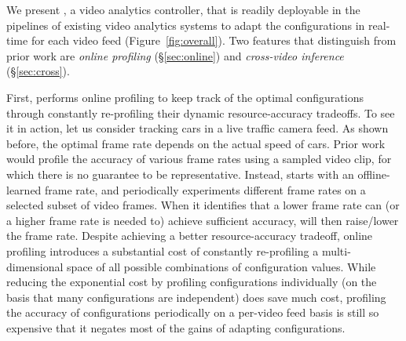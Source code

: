 We present {\em \name}, a video analytics controller, that is readily
deployable in the pipelines of existing video analytics systems to
adapt the configurations in real-time for each video feed 
(Figure~\ref{fig:overall}).
Two features that distinguish \name from prior work are
{\em online profiling} (\S\ref{sec:online}) and {\em cross-video 
inference} (\S\ref{sec:cross}).



First, \name performs online profiling to keep track of the optimal \nn 
configurations through constantly re-profiling their dynamic 
resource-accuracy tradeoffs.
To see it in action, let us consider tracking cars in a live traffic 
camera feed. As shown before, the optimal frame rate depends on the 
actual speed of cars. 
Prior work would profile the accuracy of various frame rates using a 
sampled video clip, for which there is no guarantee to be 
representative.
Instead, \name starts with an offline-learned frame rate, and 
periodically experiments different frame rates on a selected subset of
video frames. 
When it identifies that a lower frame rate can (or a higher frame 
rate is needed to) achieve sufficient accuracy, \name will then 
raise/lower the frame rate.
Despite achieving a better resource-accuracy tradeoff, online profiling
introduces a substantial cost of constantly re-profiling a 
multi-dimensional space of all possible combinations of configuration
values. 
While reducing the exponential cost by profiling configurations
individually (on the basis that many configurations are independent)
does save much cost, 
profiling the accuracy of configurations periodically on a per-video
feed basis is still so expensive that it negates most of the gains of 
adapting \nn configurations.

